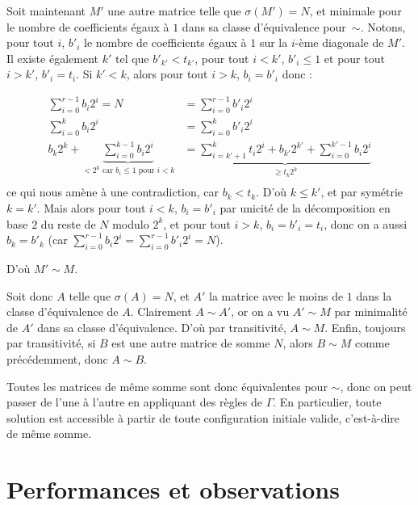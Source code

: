 \documentclass[11pt, openany]{article}
\begin{document}
Soit maintenant $M'$ une autre matrice telle que $\sigma (M')=N$, et minimale pour le nombre de coefficients égaux à $1$ dans sa classe d'équivalence pour~$\sim$. Notons, pour tout $i$, $b'_i$ le nombre de coefficients égaux à $1$ sur la $i$-ème diagonale de $M'$. Il existe également $k'$ tel que $b'_{k'} < t_{k'}$, pour tout $i<k'$, $b'_i \leq 1$ et pour tout $i>k'$, $b'_i=t_i$. Si $k'<k$, alors pour tout $i>k$, $b_i= b'_i$ donc : 


\begin{align*}
\sum\limits_{i=0}^{r-1}b_i 2^i = N &= \sum\limits_{i=0}^{r-1}b'_i 2^i\\
\sum\limits_{i=0}^k b_i 2^i &= \sum\limits_{i=0}^k b'_i 2^i\\
b_k 2^k + \underbrace{\sum\limits_{i=0}^{k-1} b_i 2^i}_{\text{$< 2^k$ car $b_i \leq 1$ pour $i<k$}} &=\underbrace{\sum\limits_{i=k'+1}^k t_i 2^i + b_{k'} 2^{k'} + \sum\limits_{i=0}^{k' -1} b_i 2^i}_{\geq t_k 2^k}\\
\end{align*}
ce qui nous amène à une contradiction, car $b_k<t_k$. D'où $k \leq k'$, et par symétrie $k = k'$. Mais alors pour tout $i<k$, $b_i = b'_i$ par unicité de la décomposition en base $2$ du reste de $N$ modulo $2^k$, et pour tout $i>k$, $b_i = b'_i = t_i$, donc on a aussi $b_k = b'_k$ (car $\sum\limits_{i=0}^{r-1} b_i 2^i = \sum\limits_{i=0}^{r-1} b'_i 2^i = N$).

D'où $M' \sim M$. 

Soit donc $A$ telle que $\sigma(A)=N$, et $A'$ la matrice avec le moins de $1$ dans la classe d'équi\-valence de $A$. Clairement $A \sim A'$, or on a vu $A'\sim M$ par minimalité de $A'$ dans sa classe d'équivalence. D'où par transitivité, $A \sim M$. Enfin, toujours par transitivité, si $B$ est une autre matrice de somme $N$, alors $B \sim M$ comme précédemment, donc $A \sim B$.

Toutes les matrices de même somme sont donc équivalentes pour $\sim$, donc on peut passer de l'une à l'autre en appliquant des règles de $\Gamma$. En particulier, toute solution est accessible à partir de toute configuration initiale valide, c'est-à-dire de même somme. 



\section*{Performances et observations}
\end{document}
